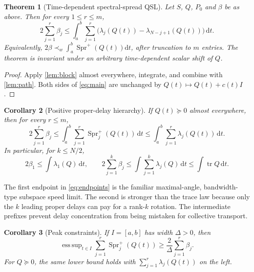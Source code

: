 \documentclass[11pt]{article}
\newtheorem{theorem}{Theorem}[section]
\newtheorem{corollary}[theorem]{Corollary}
\theoremstyle{definition}
\theoremstyle{remark}
\newcommand{\tr}{\operatorname{tr}}
\newcommand{\dd}{\mathrm d}
\newcommand{\Spr}{\operatorname{Spr}^{+}}
\begin{document}
\begin{theorem}[Time-dependent spectral-spread QSL]\label{thm:main}
Let $S$, $Q$, $P_0$ and $\beta$ be as above.  Then for every
$1\leq r\leq m$,
\begin{equation}\label{eq:main}
 \boxed{\quad
 2\sum_{j=1}^r\beta_j
 \leq\int_a^b\sum_{j=1}^r
 \bigl(\lambda_j(Q(t))-\lambda_{N-j+1}(Q(t))\bigr)\,\dd t.
 \quad}
\end{equation}
Equivalently, $2\beta\prec_w\int_a^b\Spr(Q(t))\dd t$, after
truncation to $m$ entries.  The theorem is invariant under an arbitrary
time-dependent scalar shift of $Q$.
\end{theorem}

\begin{proof}
Apply \cref{lem:block} almost everywhere, integrate, and combine with
\cref{lem:path}.  Both sides of \eqref{eq:main} are unchanged by
$Q(t)\mapsto Q(t)+c(t)I$.
\end{proof}

\begin{corollary}[Positive proper-delay hierarchy]\label{cor:positive}
If $Q(t)\succeq0$ almost everywhere, then for every $r\leq m$,
\begin{equation}\label{eq:positive}
 2\sum_{j=1}^r\beta_j
 \leq\int_a^b\sum_{j=1}^r\Spr_j(Q(t))\,\dd t
 \leq\int_a^b\sum_{j=1}^r\lambda_j(Q(t))\,\dd t.
\end{equation}
In particular, for $k\leq N/2$,
\begin{equation}\label{eq:endpoints}
 2\beta_1\leq\int\lambda_1(Q)\,\dd t,
 \qquad
 2\sum_{j=1}^k\beta_j\leq\int\sum_{j=1}^k\lambda_j(Q)\,\dd t
 \leq\int\tr Q\,\dd t.
\end{equation}
\end{corollary}

The first endpoint in \eqref{eq:endpoints} is the familiar maximal-angle,
bandwidth-type subspace speed limit.  The second is stronger than the trace
law because only the $k$ leading proper delays can pay for a rank-$k$
rotation.  The intermediate prefixes prevent delay concentration from being
mistaken for collective transport.

\begin{corollary}[Peak constraints]\label{cor:peak}
If $I=[a,b]$ has width $\Delta>0$, then
\begin{equation}
 \mathop{\mathrm{ess\,sup}}_{t\in I}
 \sum_{j=1}^r\Spr_j(Q(t))
 \geq\frac{2}{\Delta}\sum_{j=1}^r\beta_j.
\end{equation}
For $Q\succeq0$, the same lower bound holds with
$\sum_{j=1}^r\lambda_j(Q(t))$ on the left.
\end{corollary}
\end{document}
